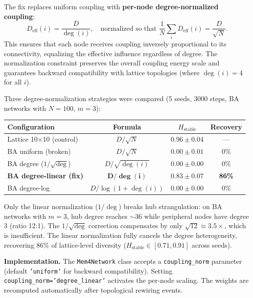 \documentclass[11pt]{article}
\begin{document}
The fix replaces uniform coupling with \textbf{per-node degree-normalized coupling}:
\begin{equation}
    D_{\text{eff}}(i) = \frac{D}{\deg(i)}, \quad \text{normalized so that } \frac{1}{N}\sum_i D_{\text{eff}}(i) = \frac{D}{\sqrt{N}}.
    \label{eq:degree_norm}
\end{equation}
This ensures that each node receives coupling inversely proportional to its connectivity, equalizing the effective influence regardless of degree. The normalization constraint preserves the overall coupling energy scale and guarantees backward compatibility with lattice topologies (where $\deg(i) = 4$ for all $i$).

Three degree-normalization strategies were compared (5 seeds, 3000 steps, BA networks with $N=100$, $m=3$):
\begin{center}
\begin{tabular}{lccc}
\toprule
\textbf{Configuration} & \textbf{Formula} & \textbf{$H_{\text{stable}}$} & \textbf{Recovery} \\
\midrule
Lattice 10$\times$10 (control) & $D/\sqrt{N}$ & $0.96 \pm 0.04$ & --- \\
BA uniform (broken) & $D/\sqrt{N}$ & $0.00 \pm 0.01$ & 0\% \\
BA degree ($1/\sqrt{\deg}$) & $D/\sqrt{\deg(i)}$ & $0.00 \pm 0.00$ & 0\% \\
\textbf{BA degree-linear (fix)} & $\mathbf{D/\deg(i)}$ & $\mathbf{0.83 \pm 0.07}$ & \textbf{86\%} \\
BA degree-log & $D/\log(1{+}\deg(i))$ & $0.00 \pm 0.00$ & 0\% \\
\bottomrule
\end{tabular}
\end{center}

Only the linear normalization ($1/\deg$) breaks hub strangulation: on BA networks with $m=3$, hub degree reaches $\sim$36 while peripheral nodes have degree 3 (ratio 12:1). The $1/\sqrt{\deg}$ correction compensates by only $\sqrt{12} \approx 3.5\times$, which is insufficient. The linear normalization fully cancels the degree heterogeneity, recovering 86\% of lattice-level diversity ($H_{\text{stable}} \in [0.71, 0.91]$ across seeds).

\textbf{Implementation.} The \texttt{Mem4Network} class accepts a \texttt{coupling\_norm} parameter (default \texttt{'uniform'} for backward compatibility). Setting \texttt{coupling\_norm='degree\_linear'} activates the per-node scaling. The weights are recomputed automatically after topological rewiring events.
\end{document}
